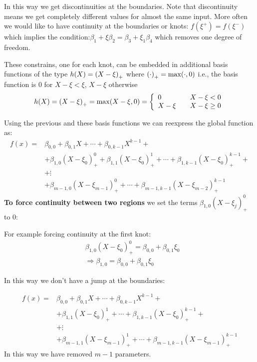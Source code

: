 \documentclass[12pt, letterpaper]{article}
\theoremstyle{definition}
\DeclarePairedDelimiter\autobracket{(}{)}
\newcommand{\br}[1]{\autobracket*{#1}}
\begin{document}
In this way we get discontinuities at the boundaries. Note that discontinuity means we get completely different values for almost the same input. More often we would like to have continuity at the boundaries or knots: $f(\xi^+)=f(\xi^-)$ which implies the condition:$\beta_1 +\xi\beta_2 = \beta_3 +\xi_1\beta_4$ which removes one degree of freedom.

These constrains, one for each knot, can be embedded in additional basis functions of the type $h(X) = \br{X - \xi}_+$ where $\br{\cdot}_+ = \max(\cdot, 0)$ i.e., the basis function is $0$ for $X - \xi<\xi$, $X - \xi$ otherwise
\begin{equation}
h(X) = \br{X - \xi}_+ = \max(X - \xi, 0) = \left\{ \begin{array}{ll}  0 &\quad X-\xi<0\\
X-\xi &\quad X-\xi\ge0
\end{array}
 \right.
\end{equation}

Using the previous and these basis functions we can reexpress the global function as:
\begin{equation}
\begin{aligned}
f(x) =& \beta_{0,0} + \beta_{0,1}X +\cdots+\beta_{0,k-1}  X^{k-1} + \\
&+\beta_{1,0}(X -\xi_0)_+^0     + \beta_{1,1}(X -\xi_0)_+^1       +\cdots +\beta_{1,k-1} (X -\xi_0)_+^{k-1}+  \\
&+\vdots \\ 
&+\beta_{m-1,0}(X -\xi_{m-1})_+^0 +\cdots +\beta_{m-1,k-1} (X -\xi_{m-2})_+^{k-1}
\end{aligned}
\end{equation}
\textbf{To force continuity between two regions} we set the terms $\beta_{1,0}(X -\xi_j)_+^0$ to $0$:

For example forcing continuity at the first knot:
\begin{equation}
\begin{aligned}
&\beta_{1,0}(X -\xi_0)_+^0 = \beta_{0,0} + \beta_{0,1} \xi_0\\
&\Rightarrow \beta_{1,0} = \beta_{0,0} + \beta_{0,1} \xi_0
\end{aligned}
\end{equation}

 In this way we don't have a jump at the boundaries:

\begin{equation}
\begin{aligned}
f(x) =& \beta_{0,0} + \beta_{0,1}X +\cdots+\beta_{0,k-1}  X^{k-1} + \\
&+ \beta_{1,1}(X -\xi_0)_+^1       +\cdots +\beta_{1,k-1} (X -\xi_0)_+^{k-1}+  \\
&+\vdots \\ 
&+ \beta_{m-1,1}(X -\xi_{m-1})_+^1 +\cdots +\beta_{m-1,k-1} (X -\xi_{m-1})_+^{k-1}
\end{aligned}
\end{equation}
In this way we have removed $m-1$ parameters.
\end{document}
